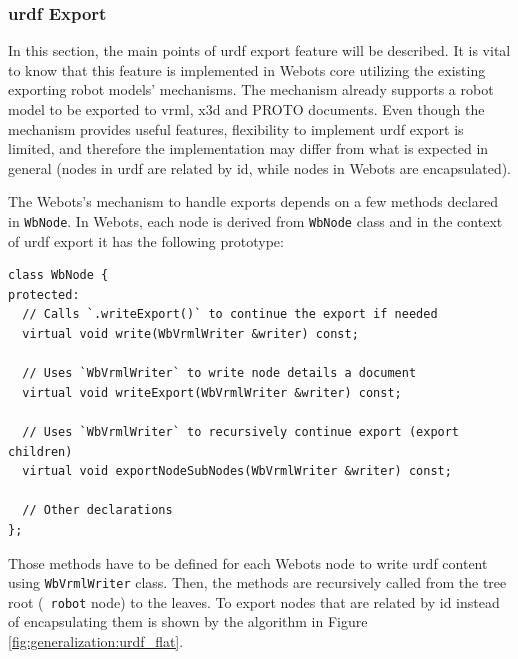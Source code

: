 \subsubsection{\ac{urdf} Export}
\label{subsub:generalization:urdf_export}

In this section, the main points of \ac{urdf} export feature will be described.
It is vital to know that this feature is implemented in Webots core utilizing the existing exporting robot models' mechanisms.
The mechanism already supports a robot model to be exported to \acs{vrml}, \acs{x3d} and PROTO documents.
Even though the mechanism provides useful features, flexibility to implement \ac{urdf} export is limited, and therefore the implementation may differ from what is expected in general (nodes in \ac{urdf} are related by \acs{id}, while nodes in Webots are encapsulated).

The Webots's mechanism to handle exports depends on a few methods declared in \texttt{WbNode}.
In Webots, each node is derived from \texttt{WbNode} class and in the context of \ac{urdf} export it has the following prototype:
\begin{verbatim}
class WbNode {
protected:
  // Calls `.writeExport()` to continue the export if needed
  virtual void write(WbVrmlWriter &writer) const;

  // Uses `WbVrmlWriter` to write node details a document
  virtual void writeExport(WbVrmlWriter &writer) const;
  
  // Uses `WbVrmlWriter` to recursively continue export (export children)
  virtual void exportNodeSubNodes(WbVrmlWriter &writer) const;
  
  // Other declarations
};
\end{verbatim}

Those methods have to be defined for each Webots node to write \ac{urdf} content using \texttt{WbVrmlWriter} class.
Then, the methods are recursively called from the tree root (\texttt{ robot} node) to the leaves.
To export nodes that are related by \acs{id} instead of encapsulating them is shown by the algorithm in Figure \ref{fig:generalization:urdf_flat}.

